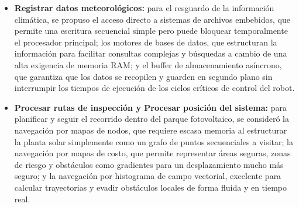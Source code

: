 \documentclass[../../General.tex]{subfiles}
\begin{document}
\begin{itemize}
	\item \textbf{Registrar datos meteorológicos:} para el resguardo de la información climática, se propuso el acceso directo a sistemas de archivos embebidos, que permite una escritura secuencial simple pero puede bloquear temporalmente el procesador principal; los motores de bases de datos, que estructuran la información para facilitar consultas complejas y búsquedas a cambio de una alta exigencia de memoria RAM; y el buffer de almacenamiento asíncrono, que garantiza que los datos se recopilen y guarden en segundo plano sin interrumpir los tiempos de ejecución de los ciclos críticos de control del robot.
	
	\item \textbf{Procesar rutas de inspección y Procesar posición del sistema:} para planificar y seguir el recorrido dentro del parque fotovoltaico, se consideró la navegación por mapas de nodos, que requiere escasa memoria al estructurar la planta solar simplemente como un grafo de puntos secuenciales a visitar; la navegación por mapas de costo, que permite representar áreas seguras, zonas de riesgo y obstáculos como gradientes para un desplazamiento mucho más seguro; y la navegación por histograma de campo vectorial, excelente para calcular trayectorias y evadir obstáculos locales de forma fluida y en tiempo real.
\end{itemize}
\end{document}
